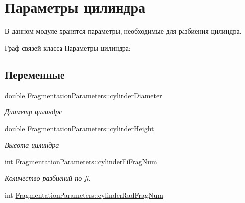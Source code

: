 \hypertarget{group__cylinder_parameters}{}\section{Параметры цилиндра}
\label{group__cylinder_parameters}


В данном модуле хранятся параметры, необходимые для разбиения цилиндра.  


Граф связей класса Параметры цилиндра\+:
\subsection*{Переменные}
\begin{DoxyCompactItemize}
\item 
\mbox{\label{group__cylinder_parameters_ga8f3c26e937891e983eb9a6f6c14e7c03}} 
double \mbox{\hyperlink{group__cylinder_parameters_ga8f3c26e937891e983eb9a6f6c14e7c03}{Fragmentation\+Parameters\+::cylinder\+Diameter}}
\begin{DoxyCompactList}\small\item\em Диаметр цилиндра \end{DoxyCompactList}\item 
\mbox{\label{group__cylinder_parameters_gaa4dc4668f162a2f8c7bac221d8e3685a}} 
double \mbox{\hyperlink{group__cylinder_parameters_gaa4dc4668f162a2f8c7bac221d8e3685a}{Fragmentation\+Parameters\+::cylinder\+Height}}
\begin{DoxyCompactList}\small\item\em Высота цилиндра \end{DoxyCompactList}\item 
\mbox{\label{group__cylinder_parameters_gaf2ce6a505c18dabc6ac9854b29fd0c0e}} 
int \mbox{\hyperlink{group__cylinder_parameters_gaf2ce6a505c18dabc6ac9854b29fd0c0e}{Fragmentation\+Parameters\+::cylinder\+Fi\+Frag\+Num}}
\begin{DoxyCompactList}\small\item\em Количество разбиений по fi. \end{DoxyCompactList}\item 
\mbox{\label{group__cylinder_parameters_ga004a13f947c1f437f57f29fc6bbe5f7d}} 
int \mbox{\hyperlink{group__cylinder_parameters_ga004a13f947c1f437f57f29fc6bbe5f7d}{Fragmentation\+Parameters\+::cylinder\+Rad\+Frag\+Num}}

\end{DoxyCompactItemize}
